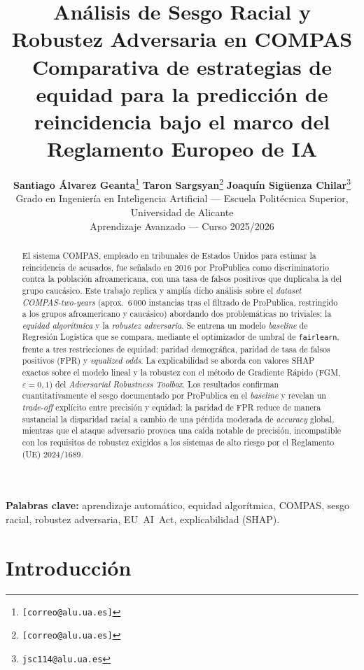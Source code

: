 \documentclass[11pt,a4paper]{article}
\title{
    \textbf{Análisis de Sesgo Racial y Robustez Adversaria en COMPAS}\\[4pt]
    \large Comparativa de estrategias de equidad para la predicción de reincidencia bajo el marco del Reglamento Europeo de IA
}
\author{
    \textbf{Santiago Álvarez Geanta}\thanks{\texttt{[correo@alu.ua.es]}}
    \quad
    \textbf{Taron Sargsyan}\thanks{\texttt{[correo@alu.ua.es]}}
    \quad
    \textbf{Joaquín Sigüenza Chilar}\thanks{\texttt{jsc114@alu.ua.es}}
    \\[4pt]
    \small Grado en Ingeniería en Inteligencia Artificial
    --- Escuela Politécnica Superior, Universidad de Alicante\\
    \small Aprendizaje Avanzado --- Curso 2025/2026
}
\date{}
\begin{document}
\maketitle
\thispagestyle{empty}


\begin{abstract}
\noindent El sistema COMPAS, empleado en tribunales de Estados Unidos para estimar la reincidencia de acusados, fue señalado en 2016 por ProPublica como discriminatorio contra la población afroamericana, con una tasa de falsos positivos que duplicaba la del grupo caucásico. Este trabajo replica y amplía dicho análisis sobre el \textit{dataset} \textit{COMPAS-two-years} (aprox.\ 6\,000 instancias tras el filtrado de ProPublica, restringido a los grupos afroamericano y caucásico) abordando dos problemáticas no triviales: la \textit{equidad algorítmica} y la \textit{robustez adversaria}. Se entrena un modelo \textit{baseline} de Regresión Logística que se compara, mediante el optimizador de umbral de \texttt{fairlearn}, frente a tres restricciones de equidad: paridad demográfica, paridad de tasa de falsos positivos (FPR) y \textit{equalized odds}. La explicabilidad se aborda con valores SHAP exactos sobre el modelo lineal y la robustez con el método de Gradiente Rápido (FGM, $\varepsilon{=}0{,}1$) del \textit{Adversarial Robustness Toolbox}. Los resultados confirman cuantitativamente el sesgo documentado por ProPublica en el \textit{baseline} y revelan un \textit{trade-off} explícito entre precisión y equidad: la paridad de FPR reduce de manera sustancial la disparidad racial a cambio de una pérdida moderada de \textit{accuracy} global, mientras que el ataque adversario provoca una caída notable de precisión, incompatible con los requisitos de robustez exigidos a los sistemas de alto riesgo por el Reglamento (UE) 2024/1689.
\end{abstract}

\smallskip
\noindent\textbf{Palabras clave:} aprendizaje automático, equidad algorítmica, COMPAS, sesgo racial, robustez adversaria, EU~AI~Act, explicabilidad (SHAP).

\tableofcontents
\newpage


\section{Introducción}
\end{document}
